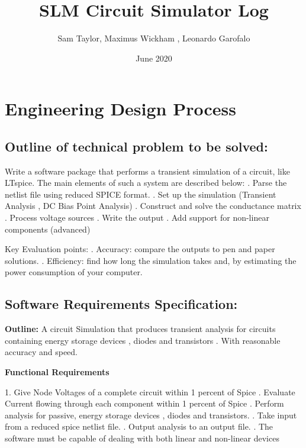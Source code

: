 \documentclass{article}
\title{SLM Circuit Simulator Log}
\author{Sam Taylor, Maximus Wickham , Leonardo Garofalo}
\date{June 2020}
\begin{document}
\maketitle
\newpage
\tableofcontents
\newpage

\section{Engineering Design Process}
\flushleft

\subsection{Outline of technical problem to be solved:}
\flushleft

\smallbreak
Write a software package that performs a transient simulation of a circuit, like LTspice. The main elements of such a system are described below:
\newline
{}. Parse the netlist file using reduced SPICE format.
. Set up the simulation (Transient Analysis , DC Bias Point Analysis)
. Construct and solve the conductance matrix
. Process voltage sources
. Write the output
. Add support for non-linear components (advanced)
\newline
\mediumbreak 

Key Evaluation points:
. Accuracy: compare the outputs to pen and paper solutions. 
. Efficiency: find how long the simulation takes and, by estimating the power consumption of your computer.

\subsection{Software Requirements Specification:}
\flushleft
\textbf{Outline:} A circuit Simulation that produces transient analysis for circuits containing energy storage devices , diodes and transistors . With reasonable accuracy and speed.

\bigbreak

\textbf{Functional Requirements}

\newline

1. Give Node Voltages of a complete circuit within 1 percent of Spice
. Evaluate Current flowing through each component within 1 percent of Spice
. Perform analysis for passive, energy storage devices , diodes and transistors.
. Take input from a reduced spice netlist file.
. Output analysis to an output file.
. The software must be capable of dealing with both linear and non-linear devices
\end{document}
